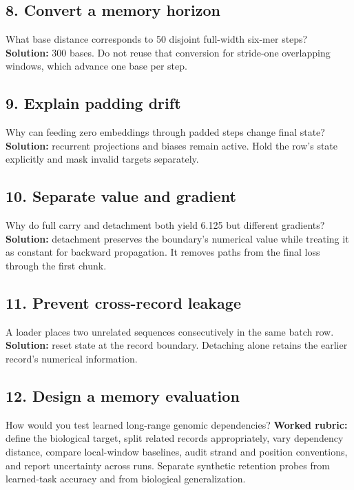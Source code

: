 \subsection*{8. Convert a memory horizon}
What base distance corresponds to 50 disjoint full-width six-mer steps?
\textbf{Solution:} 300 bases. Do not reuse that conversion for stride-one
overlapping windows, which advance one base per step.

\subsection*{9. Explain padding drift}
Why can feeding zero embeddings through padded steps change final state?
\textbf{Solution:} recurrent projections and biases remain active.
Hold the row's state explicitly and mask invalid targets separately.

\clearpage
\subsection*{10. Separate value and gradient}
Why do full carry and detachment both yield 6.125 but different gradients?
\textbf{Solution:} detachment preserves the boundary's numerical value
while treating it as constant for backward propagation. It removes paths
from the final loss through the first chunk.

\subsection*{11. Prevent cross-record leakage}
A loader places two unrelated sequences consecutively in the same batch row.
\textbf{Solution:} reset state at the record boundary. Detaching alone
retains the earlier record's numerical information.

\subsection*{12. Design a memory evaluation}
How would you test learned long-range genomic dependencies?
\textbf{Worked rubric:} define the biological target, split related records
appropriately, vary dependency distance, compare local-window baselines,
audit strand and position conventions, and report uncertainty across runs.
Separate synthetic retention probes from learned-task accuracy and from
biological generalization.
